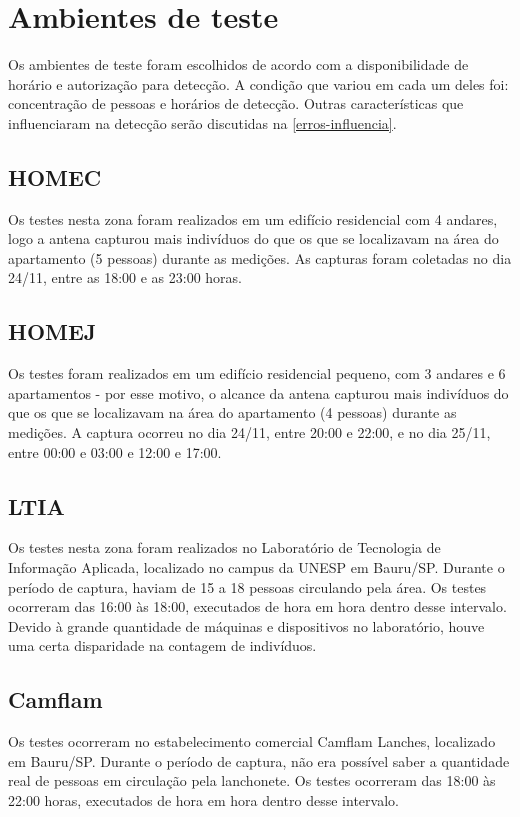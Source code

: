 \section{Ambientes de teste}
Os ambientes de teste foram escolhidos de acordo com a disponibilidade de horário e autorização
para detecção. A condição que variou em cada um deles foi: concentração de pessoas e horários de detecção.
Outras características que influenciaram na detecção serão discutidas na \autoref{erros-influencia}.

\subsection{HOMEC}

Os testes nesta zona foram realizados em um edifício residencial com 4 andares,
logo a antena capturou mais indivíduos do que os que se localizavam na área do
apartamento (5 pessoas) durante as medições. As capturas foram coletadas
no dia 24/11, entre as 18:00 e as 23:00 horas.

\subsection{HOMEJ}
Os testes foram realizados em um edifício residencial pequeno, com 3
andares e 6 apartamentos - por esse motivo, o alcance da antena capturou mais
indivíduos do que os que se localizavam na área do apartamento (4 pessoas)
durante as medições. A captura ocorreu no dia 24/11, entre
20:00 e 22:00, e no dia
25/11, entre 00:00 e 03:00 e 12:00 e 17:00.

\subsection{LTIA}
Os testes nesta zona foram realizados no Laboratório de Tecnologia de Informação
Aplicada, localizado no campus da UNESP em Bauru/SP. Durante o período de
captura, haviam de 15 a 18 pessoas circulando pela área.  Os testes ocorreram
das 16:00 às 18:00, executados de hora em hora dentro desse intervalo.
Devido à grande quantidade de máquinas e dispositivos no laboratório, houve uma
certa disparidade na contagem de indivíduos.

\subsection{Camflam}
Os testes ocorreram no estabelecimento comercial Camflam Lanches, localizado em Bauru/SP. Durante o período de captura, não era possível saber a quantidade real de pessoas em circulação pela lanchonete.  Os testes ocorreram das 18:00 às 22:00 horas, executados de hora em hora dentro desse intervalo.

